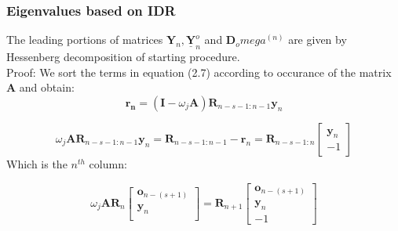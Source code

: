 \documentclass[mathserif]{beamer}
\begin{document}
\begin{frame}
\frametitle{Eigenvalues based on IDR}
The leading portions of matrices $\mathbf{Y}_n, \underline{\mathbf{Y}}_n^o$ and $\mathbf{D}_omega^{(n)}$ are given by Hessenberg decomposition of starting procedure.\\
\vspace{.1in}
\pause
Proof: We sort the terms in equation (2.7) according to occurance of the matrix $\mathbf{A}$ and obtain:
\[ \tag{2.7} \mathbf{r_n}= (\mathbf{I}-\omega_j\mathbf{A})\mathbf{R}_{n-s-1:n-1}\mathbf{y}_n \]

\[ \tag{2.8} \omega_j\mathbf{A}\mathbf{R}_{n-s-1:n-1}\mathbf{y}_n=\mathbf{R}_{n-s-1:n-1}-\mathbf{r}_n=\mathbf{R}_{n-s-1:n}  \begin{bmatrix}
        \mathbf{y}_n  \\ 
         -1
\end{bmatrix}\]
 Which is the $n^{th}$ column: 
\pause

\[\omega_j\mathbf{A}\mathbf{R}_n \begin{bmatrix}
        \mathbf{o}_{n-(s+1)}  \\ 
        \mathbf{y}_n  \\ 
\end{bmatrix} = \mathbf{R}_{n+1}     \begin{bmatrix}
        \mathbf{o}_{n-(s+1)}  \\ 
        \mathbf{y}_n  \\ 
-1
\end{bmatrix}    \]
\end{frame}
\end{document}
